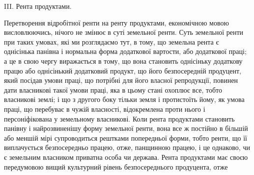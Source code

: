 III. Рента продуктами.

Перетворення відробітної ренти на ренту продуктами, економічною мовою
висловлюючись, нічого не змінює в суті земельної ренти. Суть земельної ренти при
таких умовах, які ми розглядаємо тут, в тому, що земельна рента є однісінька
панівна і нормальна форма додаткової вартости, або додаткової праці; а це в
свою чергу виражається в тому, що вона становить однісіньку додаткову працю
або однісінький додатковий продукт, що його безпосередній продуцент, який
посідав умови праці, що потрібні для його власної репродукції, повинен
дати власникові такої умови праці, яка в цьому стані охоплює все, тобто
власникові землі; і що з другого боку тільки земля і протистоїть йому, як
умова праці, що перебуває в чужій власності, відокремлена проти нього і
персоніфікована у земельному власникові. Коли рента продуктами становить
панівну і найрозвиненішу форму земельної ренти, вона все ж постійно в більшій
або меншій мірі супроводиться рештками попередньої форми, тобто ренти, що
її виплачується безпосередньо працею, отже, панщинною працею, і це однаково,
чи є земельним власником приватна особа чи держава. Рента продуктами має
своєю передумовою вищий культурний рівень безпосереднього продуцента, отже
\parbreak{}  %
